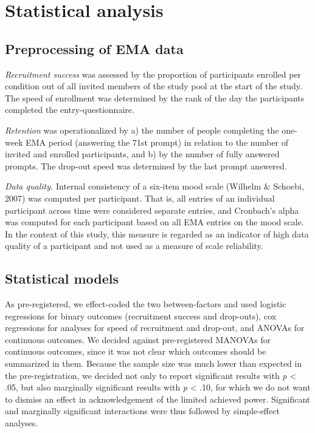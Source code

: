 \documentclass[authordate, empirical,issue]{jote-new-article}
\begin{document}
\section{Statistical analysis}



\subsection{Preprocessing of EMA data}



\emph{Recruitment success} was assessed by the proportion of participants enrolled per condition out of all invited members of the study pool at the start of the study. The speed of enrollment was determined by the rank of the day the participants completed the entry-questionnaire.



\emph{Retention }was operationalized by a) the number of people completing the one-week EMA period (answering the 71st prompt) in relation to the number of invited and enrolled participants, and b) by the number of fully answered prompts. The drop-out speed was determined by the last prompt answered.



\emph{Data quality. }Internal consistency of a six-item mood scale (Wilhelm \& Schoebi, 2007) was computed per participant. That is, all entries of an individual participant across time were considered separate entries, and Cronbach's alpha was computed for each participant based on all EMA entries on the mood scale. In the context of this study, this measure is regarded as an indicator of high data quality of a participant and not used as a measure of scale reliability.



\subsection{Statistical models}



As pre-registered, we effect-coded the two between-factors and used logistic regressions for binary outcomes (recruitment success and drop-outs), cox regressions for analyses for speed of recruitment and drop-out, and ANOVAs for continuous outcomes. We decided against pre-registered MANOVAs for continuous outcomes, since it was not clear which outcomes should be summarized in them. Because the sample size was much lower than expected in the pre-registration, we decided not only to report significant results with \emph{p} < .05, but also marginally significant results with \emph{p} < .10, for which we do not want to dismiss an effect in acknowledgement of the limited achieved power. Significant and marginally significant interactions were thus followed by simple-effect analyses.
\end{document}
